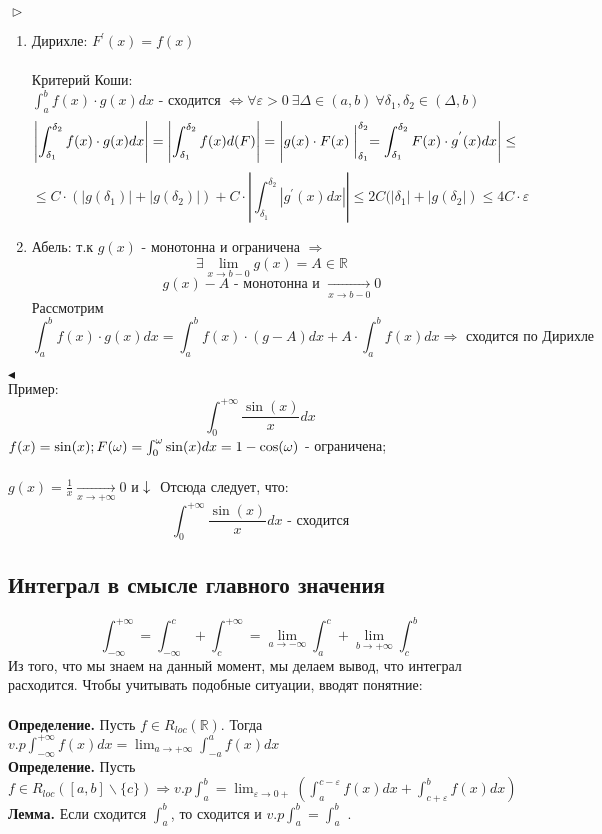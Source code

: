\documentclass{article}
\newcommand*{\lemma}[1]{\textbf{Лемма.} #1. \newline}
\newcommand*{\definition}[1]{\textbf{Определение.} #1 \newline}
\newcommand*{\prooff}[1]{$\vartriangleright$ #1 $\blacktriangleleft$}
\newcommand*{\R}{\mathbb{R}}
\begin{document}
\prooff{
    \begin{enumerate}
        \item Дирихле: {
            $F^{'}(x) = f(x)$\\\\
            Критерий Коши: $\int_{a}^{b}f(x) \cdot g(x)dx \text{ - сходится }\Leftrightarrow \forall \varepsilon > 0\ \exists \Delta \in (a, b)\ \forall\delta_1, \delta_2 \in (\Delta, b)$
            $$
                \left|\int_{\delta_1}^{\delta_2}f(x)\cdot g(x)dx\right| = \left|\int_{\delta_1}^{\delta_2}f(x)d(F)\right| = \left|g(x) \cdot F(x)\biggm\vert_{\delta_1}^{\delta_2} = \int_{\delta_1}^{\delta_2}F(x) \cdot g^{'}(x)dx\right|\leq
            $$
            $$
                \leq C \cdot (|g(\delta_1)|+|g(\delta_2)|) + C \cdot \left|\int_{\delta_1}^{\delta_2}|g^{'}(x)dx|\right| \leq 2C(|\delta_1|+|g(\delta_2|) \leq 4C \cdot \varepsilon 
            $$
        }
        \item Абель:{
            т.к $g(x)$ - монотонна и ограничена $\Rightarrow$
            $$
                \exists \displaystyle \lim_{x \to b - 0} g(x) = A \in \R
            $$
            $$
                g(x) - A \text{ - монотонна и } \xrightarrow[x \to b - 0]{}0
            $$
            Рассмотрим
            $$
                \int_{a}^{b} f(x) \cdot g(x) dx = \int_{a}^{b} f(x) \cdot (g - A)dx + A \cdot \int_{a}^{b} f(x)dx \Rightarrow \text{ сходится по Дирихле}
            $$  
        }
    \end{enumerate}
}
\\
Пример: 
$$
    \int_{0}^{+\infty} \frac{\sin(x)}{x}dx
$$
$f(x) = \sin(x);\\\\ F(\omega) = \int_{0}^{\omega}\sin(x)dx = 1 - \cos(\omega)$ - ограничена;\\\\ $g(x) = \frac{1}{x} \xrightarrow[x \to + \infty]{}0$ и $\downarrow\\\\$
Отсюда следует, что: 
$$
    \int_{0}^{+\infty} \frac{\sin(x)}{x}dx \text{ - сходится}
$$
\subsection{Интеграл в смысле главного значения}
$$
    \int_{-\infty}^{+\infty} = \int_{-\infty}^{c} + \int_{c}^{+\infty} = \displaystyle \lim_{a \to -\infty} \int_{a}^{c} + \lim_{b \to +\infty} \int_{c}^{b}
$$
Из того, что мы знаем на данный момент, мы делаем вывод, что интеграл расходится. Чтобы учитывать подобные ситуации, вводят понятние:\\\\
\definition{ Пусть $f \in R_{loc}(\R)$. Тогда $v.p \int_{-\infty}^{+\infty} f(x)dx = \displaystyle \lim_{a \to +\infty} \int_{-a}^{a}f(x)dx$}\\
\definition{ Пусть $f \in R_{loc}([a, b] \backslash \{c\}) \Rightarrow v.p \int_{a}^{b} = \lim_{\varepsilon \to 0+}\left(\int_{a}^{c - \varepsilon}f(x)dx + \int_{c + \varepsilon}^{b}f(x)dx\right)$}
\lemma{
    Если сходится $\int_{a}^{b}$, то сходится и $v.p \int_{a}^{b} = \int_{a}^{b}$ 
}
\newpage
\end{document}
